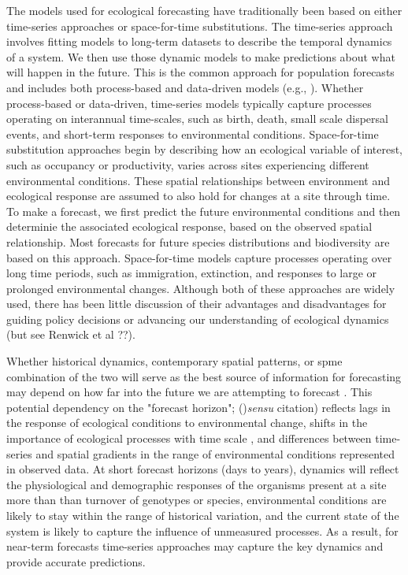 \documentclass[11pt]{article}
\begin{document}
The models used for ecological forecasting have traditionally been based on either time-series approaches or space-for-time substitutions.
The time-series approach involves fitting models to long-term datasets to describe the temporal dynamics of a system.  We then use those
dynamic models to make predictions about what will happen in the future. This is the common approach for population forecasts and includes 
both process-based and data-driven models (e.g., \citep{ward_complexity_2014}). Whether process-based or
data-driven, time-series models typically capture processes operating on interannual time-scales, such as birth, death, 
small scale dispersal events, and short-term responses to environmental conditions.
Space-for-time substitution approaches begin by describing how an ecological variable of interest, such as occupancy or productivity, 
varies across sites experiencing different environmental conditions. These spatial relationships between environment and ecological 
response are assumed to also hold for changes at a site through time. To make a forecast, we first predict the future
environmental conditions and then determinie the associated ecological response, based on the observed spatial relationship. 
Most forecasts for future species distributions and biodiversity are based on this approach. 
Space-for-time models capture processes operating over long time periods, such as
immigration, extinction, and responses to large or prolonged environmental changes. Although both of these approaches are
widely used, there has been little discussion of their advantages and disadvantages for guiding policy decisions or 
advancing our understanding of ecological dynamics \citep{harris_forecasting_2018} (but see Renwick et al ??).

Whether historical dynamics, contemporary spatial patterns, or spme combination of the two will serve as the best source of 
information for forecasting may depend on how far into the future we are attempting to forecast \citep{harris_forecasting_2018}. 
This potential dependency on the "forecast horizon"; ()\textit{sensu} citation)
reflects lags in the response of ecological conditions to environmental change, shifts in the importance of ecological processes with
time scale \citep{levin_1992,rosenzweig_1995}, and differences between time-series and spatial gradients in the range of 
environmental conditions represented in observed data.
At short forecast horizons (days to years), dynamics will reflect the physiological and demographic responses of 
the organisms present at a site more than than turnover of genotypes or species, 
environmental conditions are likely to stay within the range of historical variation, 
and the current state of the system is likely to capture the influence of unmeasured processes. As a result, 
for near-term forecasts time-series approaches may capture the key dynamics and provide accurate predictions.
\end{document}
